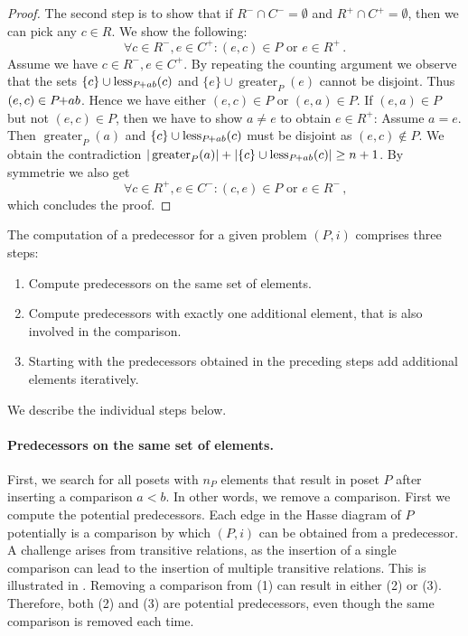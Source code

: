 \documentclass[twoside,leqno,twocolumn]{article}
\newcommand{\pchild}[3]{{#1}\kern-1pt{+}{#2}{#3}}
\newcommand{\less}[2]{\operatorname{less}_{#1}(#2)}
\newcommand{\greater}[2]{\operatorname{greater}_{#1}(#2)}
\begin{document}
\begin{proof}
  The second step is to show that if $R^- \cap C^- = \emptyset$ and $R^+ \cap C^+ = \emptyset$, then we can pick any $c \in R$.
  We show the following:
  \begin{equation}
    \forall c \in R^-, e \in C^+ \colon (e, c) \in P \text{ or } e \in R^+\,\text{.}
  \end{equation}
  Assume we have $c \in R^-, e \in C^+$.
  By repeating the counting argument we observe that the sets $\{c\} \cup \less{\pchild{P}{a}{b}}{c}$ and $\{e\} \cup \greater{P}{e}$ cannot be disjoint.
  Thus $(e, c) \in \pchild{P}{a}{b}$.
  Hence we have either $(e, c) \in P$ or $(e, a) \in P$.
  If $(e, a) \in P$ but not $(e, c) \in P$, then we have to show $a \neq e$ to obtain $e \in R^+$:
  Assume $a = e$.
  Then $\greater{P}{a}$ and $\{c\} \cup \less{\pchild{P}{a}{b}}{c}$ must be disjoint as $(e, c) \notin P$.
  We obtain the contradiction $|\greater{P}{a}| + |\{c\} \cup \less{\pchild{P}{a}{b}}{c}| \ge n + 1$.
  By symmetrie we also get
  \begin{equation}
    \forall c \in R^+, e \in C^- \colon (c, e) \in P \text{ or } e \in R^-\,\text{,}
  \end{equation}
  which concludes the proof.
\end{proof}

The computation of a predecessor for a given problem $(P, i)$ comprises three steps:
\begin{enumerate}
  \item Compute predecessors on the same set of elements.
  \item Compute predecessors with exactly one additional element, that is also involved in the comparison.
  \item Starting with the predecessors obtained in the preceding steps add additional elements iteratively.
\end{enumerate}
We describe the individual steps below.

\paragraph{Predecessors on the same set of elements.}
First, we search for all posets with $n_P$ elements that result in poset $P$ after inserting a comparison $a < b$.
In other words, we remove a comparison.
First we compute the potential predecessors.
Each edge in the Hasse diagram of $P$ potentially is a comparison by which $(P, i)$ can be obtained from a predecessor.
A challenge arises from transitive relations, as the insertion of a single comparison can lead to the insertion of multiple transitive relations.
This is illustrated in .
Removing a comparison from (1) can result in either (2) or (3).
Therefore, both (2) and (3) are potential predecessors, even though the same comparison is removed each time.
\end{document}
